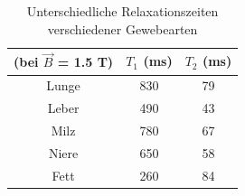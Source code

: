 \begin{table}[h]
	\centering
		\begin{tabular}{|c|c|c|}
			\hline
			(bei $\vec{B}$ = 1.5 T) & $T_1$ (ms) & $T_2$ (ms) \\
			\hline
			Lunge & 830 & 79 \\
			Leber & 490 & 43 \\
			Milz & 780 & 67 \\
			Niere & 650 & 58 \\
			Fett & 260 & 84 \\	
			\hline	
		\end{tabular}
		\caption{Unterschiedliche Relaxationszeiten verschiedener Gewebearten}
		\label{mri:quant:tab:zeiten}
\end{table}
%









